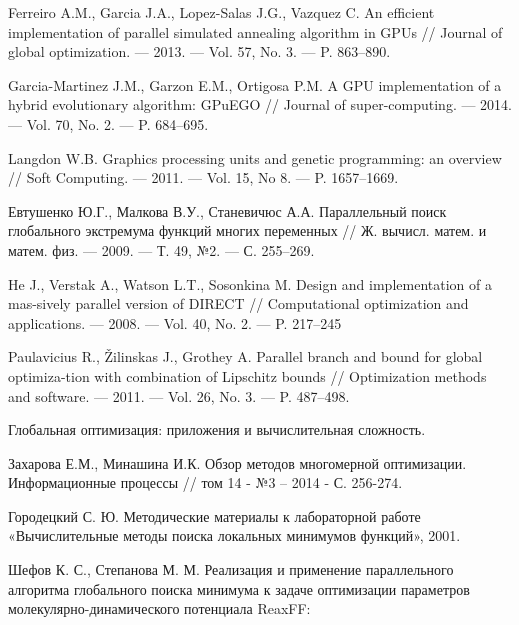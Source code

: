 \documentclass{svproc}
\begin{document}
%
%

\begin{thebibliography}{6}
%

Ferreiro A.M., Garcia J.A., Lopez-Salas J.G., Vazquez C. An efficient implementation of parallel simulated annealing algorithm in GPUs // Journal of global optimization. — 2013. — Vol. 57, No. 3. — P. 863–890.

Garcia-Martinez J.M., Garzon E.M., Ortigosa P.M. A GPU implementation of a hybrid evolutionary algorithm: GPuEGO // Journal of super-computing. — 2014. — Vol. 70, No. 2. — P. 684–695.

Langdon W.B. Graphics processing units and genetic programming: an overview // Soft Computing. — 2011. — Vol. 15, No 8. — P. 1657–1669.

Евтушенко Ю.Г., Малкова В.У., Станевичюс А.А. Параллельный поиск глобального экстремума функций многих переменных // Ж. вычисл. матем. и матем. физ. — 2009. — Т. 49, №2. — С. 255–269.

He J., Verstak A., Watson L.T., Sosonkina M. Design and implementation of a mas-sively parallel version of DIRECT // Computational optimization and applications. — 2008. — Vol. 40, No. 2. — P. 217–245

Paulavicius R., Žilinskas J., Grothey A. Parallel branch and bound for global optimiza-tion with combination of Lipschitz bounds // Optimization methods and software. — 2011. — Vol. 26, No. 3. — P. 487–498.

Глобальная оптимизация: приложения и вычислительная сложность. %

Захарова Е.М., Минашина И.К. Обзор методов многомерной оптимизации. Информационные процессы // том 14 - №3 – 2014 - С. 256-274.

Городецкий С. Ю. Методические материалы к лабораторной работе «Вычислительные методы поиска локальных минимумов функций», 2001.%

Шефов К. С., Степанова М. М. Реализация и применение параллельного алгоритма глобального поиска минимума к задаче оптимизации параметров молекулярно-динамического потенциала ReaxFF: %


\end{thebibliography}
\end{document}
